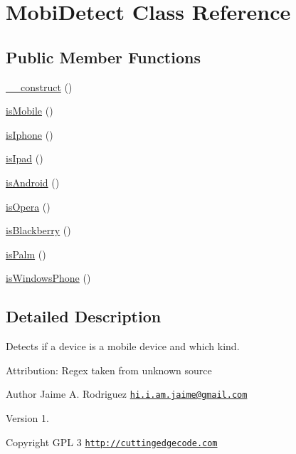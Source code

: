\hypertarget{class_mobi_detect}{\section{Mobi\-Detect Class Reference}
\label{class_mobi_detect}
}
\subsection*{Public Member Functions}
\begin{DoxyCompactItemize}
\item 
\hyperlink{class_mobi_detect_a095c5d389db211932136b53f25f39685}{\-\_\-\-\_\-construct} ()
\item 
\hyperlink{class_mobi_detect_aa03affe506ea70c6d04fab89fee473fc}{is\-Mobile} ()
\item 
\hyperlink{class_mobi_detect_abef4c1a6a8052c28a3c2dec49d3f9e9b}{is\-Iphone} ()
\item 
\hyperlink{class_mobi_detect_a2d202f72c3038ed6852aebff550dc531}{is\-Ipad} ()
\item 
\hyperlink{class_mobi_detect_abcbe8c4d1560467d47a8e19fe4554c85}{is\-Android} ()
\item 
\hyperlink{class_mobi_detect_a8a2049e411c252249d5264f87f2a894c}{is\-Opera} ()
\item 
\hyperlink{class_mobi_detect_a5eea8483425fa1d463e9df4b9e6f955b}{is\-Blackberry} ()
\item 
\hyperlink{class_mobi_detect_a1342be6bfbf8c34d00c89b8a880ac61e}{is\-Palm} ()
\item 
\hyperlink{class_mobi_detect_abd0a3ffcb33cbef4d23adbede9e3fcd4}{is\-Windows\-Phone} ()
\end{DoxyCompactItemize}


\subsection{Detailed Description}
Detects if a device is a mobile device and which kind.

Attribution\-: Regex taken from unknown source

\begin{DoxyAuthor}{Author}
Jaime A. Rodriguez \href{mailto:hi.i.am.jaime@gmail.com}{\tt hi.\-i.\-am.\-jaime@gmail.\-com} 
\end{DoxyAuthor}
\begin{DoxyVersion}{Version}
1. 
\end{DoxyVersion}
\begin{DoxyCopyright}{Copyright}
G\-P\-L 3 \href{http://cuttingedgecode.com}{\tt http\-://cuttingedgecode.\-com} 
\end{DoxyCopyright}



